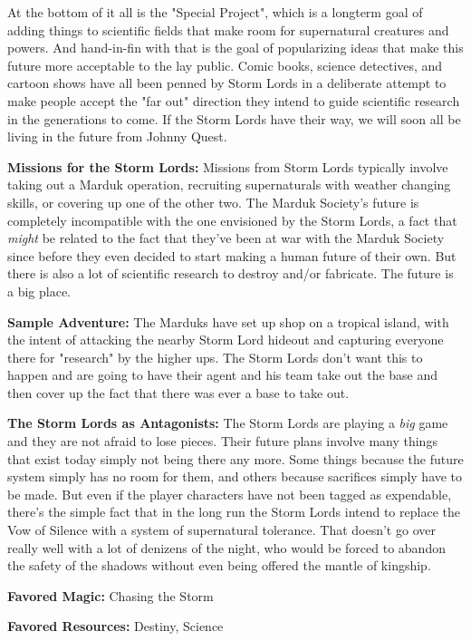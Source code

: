 At the bottom of it all is the "Special Project", which is a longterm goal of adding things to scientific fields that make room for supernatural creatures and powers. And hand-in-fin with that is the goal of popularizing ideas that make this future more acceptable to the lay public. Comic books, science detectives, and cartoon shows have all been penned by Storm Lords in a deliberate attempt to make people accept the "far out" direction they intend to guide scientific research in the generations to come. If the Storm Lords have their way, we will soon all be living in the future from Johnny Quest.

\textbf{Missions for the Storm Lords:} Missions from Storm Lords typically involve taking out a Marduk operation, recruiting supernaturals with weather changing skills, or covering up one of the other two. The Marduk Society's future is completely incompatible with the one envisioned by the Storm Lords, a fact that \textit{might} be related to the fact that they've been at war with the Marduk Society since before they even decided to start making a human future of their own. But there is also a lot of scientific research to destroy and/or fabricate. The future is a big place.

\textbf{Sample Adventure:} The Marduks have set up shop on a tropical island, with the intent of attacking the nearby Storm Lord hideout and capturing everyone there for "research" by the higher ups. The Storm Lords don't want this to happen and are going to have their agent and his team take out the base and then cover up the fact that there was ever a base to take out.

\textbf{The Storm Lords as Antagonists:} The Storm Lords are playing a \textit{big} game and they are not afraid to lose pieces. Their future plans involve many things that exist today simply not being there any more. Some things because the future system simply has no room for them, and others because sacrifices simply have to be made. But even if the player characters have not been tagged as expendable, there's the simple fact that in the long run the Storm Lords intend to replace the Vow of Silence with a system of supernatural tolerance. That doesn't go over really well with a lot of denizens of the night, who would be forced to abandon the safety of the shadows without even being offered the mantle of kingship.

\textbf{Favored Magic:}  Chasing the Storm 

\textbf{Favored Resources:} Destiny, Science

